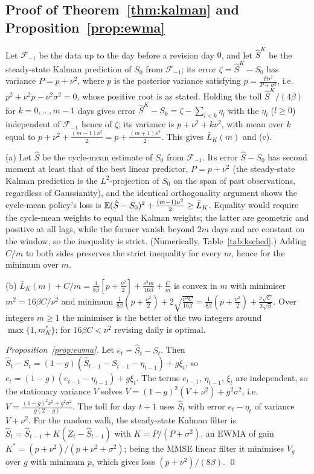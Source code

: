 \subsection{Proof of Theorem~\ref{thm:kalman} and Proposition~\ref{prop:ewma}}
Let $\mathcal F_{-1}$ be the data up to the day before a revision day $0$, and let $\hat S^K$ be the steady-state Kalman prediction of $S_0$ from $\mathcal F_{-1}$; its error $\zeta=\hat S^K-S_0$ has variance $P=p+\nu^2$, where $p$ is the posterior variance satisfying $p=\frac{P\sigma^2}{P+\sigma^2}$, i.e.\ $p^2+\nu^2p-\nu^2\sigma^2=0$, whose positive root is as stated. Holding the toll $\hat S^K/(4\beta)$ for $k=0,\dots,m-1$ days gives error $\hat S^K-S_k=\zeta-\sum_{l<k}\eta_l$ with the $\eta_l$ ($l\ge0$) independent of $\mathcal F_{-1}$ hence of $\zeta$; its variance is $p+\nu^2+k\nu^2$, with mean over $k$ equal to $p+\nu^2+\frac{(m-1)\nu^2}{2}=p+\frac{(m+1)\nu^2}2$. This gives $\bar L_K(m)$ and (c).

(a) Let $\hat S$ be the cycle-mean estimate of $S_0$ from $\mathcal F_{-1}$. Its error $\hat S-S_0$ has second moment at least that of the best linear predictor, $P=p+\nu^2$ (the steady-state Kalman prediction is the $L^2$-projection of $S_0$ on the span of past observations, regardless of Gaussianity), and the identical orthogonality argument shows the cycle-mean policy's loss is $\mathbb{E}(\hat S-S_0)^2+\frac{(m-1)\nu^2}{2}\ge\bar L_K$. Equality would require the cycle-mean weights to equal the Kalman weights; the latter are geometric and positive at all lags, while the former vanish beyond $2m$ days and are constant on the window, so the inequality is strict. (Numerically, Table~\ref{tab:ksched}.) Adding $C/m$ to both sides preserves the strict inequality for every $m$, hence for the minimum over $m$.

(b) $\bar L_K(m)+C/m=\frac1{8\beta}[p+\frac{\nu^2}2]+\frac{\nu^2m}{16\beta}+\frac Cm$ is convex in $m$ with minimiser $m^{2}=16\beta C/\nu^2$ and minimum $\frac1{8\beta}(p+\frac{\nu^2}2)+2\sqrt{\frac{\nu^2C}{16\beta}}=\frac1{8\beta}(p+\frac{\nu^2}2)+\frac{\nu\sqrt C}{2\sqrt\beta}$. Over integers $m\ge1$ the minimiser is the better of the two integers around $\max\{1,m_K^*\}$; for $16\beta C<\nu^2$ revising daily is optimal.

\emph{Proposition~\ref{prop:ewma}.} Let $e_t=\hat S_t-S_t$. Then $\hat S_t-S_t=(1-g)(\hat S_{t-1}-S_{t-1}-\eta_{t-1})+g\xi_t$, so $e_t=(1-g)(e_{t-1}-\eta_{t-1})+g\xi_t$. The terms $e_{t-1}$, $\eta_{t-1}$, $\xi_t$ are independent, so the stationary variance $V$ solves $V=(1-g)^2(V+\nu^2)+g^2\sigma^2$, i.e.\ $V=\frac{(1-g)^2\nu^2+g^2\sigma^2}{g(2-g)}$. The toll for day $t+1$ uses $\hat S_t$ with error $e_t-\eta_t$ of variance $V+\nu^2$. For the random walk, the steady-state Kalman filter is $\hat S_t=\hat S_{t-1}+K(Z_t-\hat S_{t-1})$ with $K=P/(P+\sigma^2)$, an EWMA of gain $K^*=(p+\nu^2)/(p+\nu^2+\sigma^2)$; being the MMSE linear filter it minimises $V_g$ over $g$ with minimum $p$, which gives loss $(p+\nu^2)/(8\beta)$. \qed

